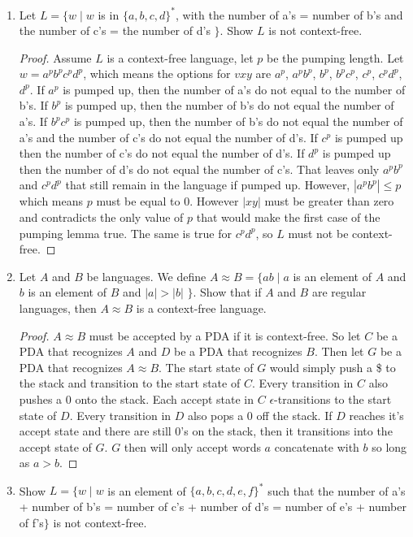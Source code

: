 \documentclass{article}
\begin{document}
\begin{enumerate}
\begin{proof}
            \end{proof}
        \item Let $L=\{w\mid w $ is in $\{a,b,c,d\}^*$, with the number of a's = number of b's and the number of c's = the number of d's $\}$. Show $L$ is not context-free.
            \begin{proof}
                Assume $L$ is a context-free language, let $p$ be the pumping length. Let $w=a^pb^pc^pd^p$, which means the options for $vxy$ are $a^p$, $a^pb^p$, $b^p$, $b^pc^p$, $c^p$, $c^pd^p$, $d^p$. If $a^p$ is pumped up, then the number of a's do not equal to the number of b's. If $b^p$ is pumped up, then the number of b's do not equal the number of a's. If $b^pc^p$ is pumped up, then the number of b's do not equal the number of a's and the number of c's do not equal the number of d's. If $c^p$ is pumped up then the number of c's do not equal the number of d's. If $d^p$ is pumped up then the number of d's do not equal the number of c's. That leaves only $a^pb^p$ and $c^pd^p$ that still remain in the language if pumped up. However, $|a^pb^p| \leq p$ which means $p$ must be equal to 0. However $|xy|$ must be greater than zero and contradicts the only value of $p$ that would make the first case of the pumping lemma true. The same is true for $c^pd^p$, so $L$ must not be context-free.
            \end{proof}
        \item Let $A$ and $B$ be languages. We define $A\approx B = \{ab \mid a $ is an element of $A$ and $b$ is an element of $B$ and $|a| > |b|$ $\}$. Show that if $A$ and $B$ are regular languages, then $A\approx B$ is a context-free language.
            \begin{proof}
                $A\approx B$ must be accepted by a PDA if it is context-free. So let $C$ be a PDA that recognizes $A$ and $D$ be a PDA that recognizes $B$. Then let $G$ be a PDA that recognizes $A\approx B$. The start state of $G$ would simply push a \$ to the stack and transition to the start state of $C$. Every transition in $C$ also pushes a 0 onto the stack. Each accept state in $C$ $\epsilon$-transitions to the start state of $D$. Every transition in $D$ also pops a 0 off the stack. If $D$ reaches it's accept state and there are still 0's on the stack, then it transitions into the accept state of $G$. $G$ then will only accept words $a$ concatenate with $b$ so long as $a>b$.
            \end{proof}
        \item Show $L = \{w\mid w $ is an element of $\{a,b,c,d,e,f\}^*$ such that the number of a's + number of b's = number of c's + number of d's = number of e's + number of f's$ \}$ is not context-free.

\end{enumerate}
\end{document}
